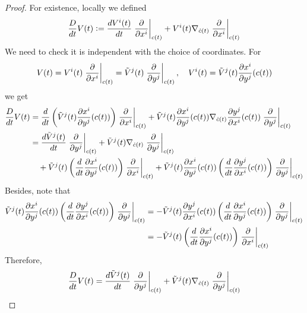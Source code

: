 \begin{proof}
	\noindent For existence, locally we defined
	\begin{equation*}
		\frac{D}{dt}V(t) \vcentcolon= \frac{dV^i(t)}{dt}\left.\frac{\partial}{\partial x^i}\right\lvert_{c(t)} + V^i(t)\nabla_{\dot{c}(t)}\left.\frac{\partial}{\partial x^i}\right\lvert_{c(t)}
	\end{equation*}
	We need to check it is independent with the choice of coordinates. For
	\begin{equation*}
		V(t) = V^i(t)\left.\frac{\partial}{\partial x^i}\right\lvert_{c(t)} = \tilde{V}^j(t)\left.\frac{\partial}{\partial y^j}\right\lvert_{c(t)},\quad V^i(t) = \tilde{V}^j(t) \frac{\partial x^i}{\partial y^j}(c(t))
	\end{equation*}
	we get
	\begin{equation*}
		\begin{aligned}
			\frac{D}{dt}V(t) &= \frac{d}{dt} \left(\tilde{V}^j(t) \frac{\partial x^i}{\partial y^j}(c(t))\right)\left.\frac{\partial}{\partial x^i}\right\lvert_{c(t)} + \tilde{V}^j(t) \frac{\partial x^i}{\partial y^j}(c(t))\nabla_{\dot{c}(t)} \frac{\partial y^j}{\partial x^i}(c(t))\left.\frac{\partial}{\partial y^j}\right\lvert_{c(t)}\\
			&= \frac{d\tilde{V}^j(t)}{dt}\left.\frac{\partial}{\partial y^j}\right\lvert_{c(t)} + \tilde{V}^j(t)\nabla_{\dot{c}(t)}\left.\frac{\partial}{\partial y^j}\right\lvert_{c(t)} \\
			&\quad + \tilde{V}^j(t) \left(\frac{d}{dt}\frac{\partial x^i}{\partial y^j}(c(t))\right) \left.\frac{\partial}{\partial x^i}\right\lvert_{c(t)} + \tilde{V}^j(t) \frac{\partial x^i}{\partial y^j}(c(t))\left(\frac{d}{dt}\frac{\partial y^j}{\partial x^i}(c(t))\right)\left.\frac{\partial}{\partial y^j}\right\lvert_{c(t)}
		\end{aligned}
	\end{equation*}
	Besides, note that
	\begin{equation*}
		\begin{aligned}
			\tilde{V}^j(t) \frac{\partial x^i}{\partial y^j}(c(t))\left(\frac{d}{dt}\frac{\partial y^j}{\partial x^i}(c(t))\right)\left.\frac{\partial}{\partial y^j}\right\lvert_{c(t)} &= -\tilde{V}^j(t) \frac{\partial y^j}{\partial x^i}(c(t))\left(\frac{d}{dt}\frac{\partial x^i}{\partial y^j}(c(t))\right)\left.\frac{\partial}{\partial y^j}\right\lvert_{c(t)} \\
			&= -\tilde{V}^j(t)\left(\frac{d}{dt}\frac{\partial x^i}{\partial y^j}(c(t))\right)\left.\frac{\partial}{\partial x^i}\right\lvert_{c(t)} 
		\end{aligned}
	\end{equation*}
	Therefore,
	\begin{equation*}
		\frac{D}{dt}V(t) = \frac{d\tilde{V}^j(t)}{dt}\lv{\frac{\partial}{\partial y^j}}_{c(t)} + \tilde{V}^j(t)\nabla_{\dot{c}(t)}\lv{\frac{\partial}{\partial y^j}}_{c(t)}

\end{equation*}
\end{proof}
